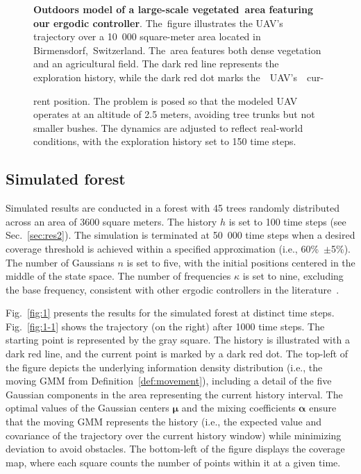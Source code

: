 \documentclass[letterpaper,10pt,conference,twoside]{IEEEtran}
\theoremstyle{definition}
\begin{document}
\begin{figure}[t!]
  \begin{minipage}[t!]{.67\columnwidth}
    \vspace*{-.15cm}
    \hspace*{.1cm}
  \end{minipage}\hspace*{.15cm}
  \begin{minipage}[t!]{.31\columnwidth}
    \caption[.]{\textbf{Outdoors model of a large-scale vegetated~area featuring our ergodic controller}. The~figure illustrates the UAV's trajectory over a 10~000 square-meter area located in Birmensdorf,~Switzerland. The~area features both dense vegetation and an agricultural field. The dark red line represents the exploration history, while the dark red dot marks the~~UAV's~~cur-
    }
    \vspace*{-.2cm}
    \label{fig:2}
  \end{minipage}
  \vspace*{-.18cm}
  \caption*{\footnotesize rent position. The problem is posed so that the modeled UAV operates at an altitude of 2.5 meters, avoiding tree trunks but not smaller bushes. The dynamics are adjusted to reflect real-world conditions, with the exploration history set to 150 time steps.}
\end{figure}

\subsection{Simulated forest}\label{sec:res1}
\noindent
Simulated results are conducted in a forest with 45 trees randomly distributed across an area of 3600 square meters. The history $h$ is set to 100 time steps (see Sec.~\ref{sec:res2}). The simulation is terminated at 50~000 time steps when a desired coverage threshold is achieved within a specified approximation (i.e., 60\%~$\pm$5\%). The number of Gaussians $n$ is set to five, with the initial positions centered in the middle of the state space. The number of frequencies $\kappa$ is set to nine, excluding the base frequency, consistent with other ergodic controllers in the literature~\cite{seewald2024energy}. 

Fig.~\ref{fig:1} presents the results for the simulated forest at distinct time steps. Fig.~\ref{fig:1-1} shows the trajectory (on the right) after 1000 time steps. The starting point is represented by the gray square. The history is illustrated with a dark red line, and the current point is marked by a dark red dot. The top-left of the figure depicts the underlying information density distribution (i.e., the moving GMM from Definition~\ref{def:movement}), including a detail of the five Gaussian components in the area representing the current history interval. The optimal values of the Gaussian centers $\boldsymbol{\mu}$ and the mixing coefficients $\boldsymbol{\alpha}$ ensure that the moving GMM represents the history (i.e., the expected value and covariance of the trajectory over the current history window) while minimizing deviation to avoid obstacles. The bottom-left of the figure displays the coverage map, where each square counts the number of points within it at a given time.
\end{document}
